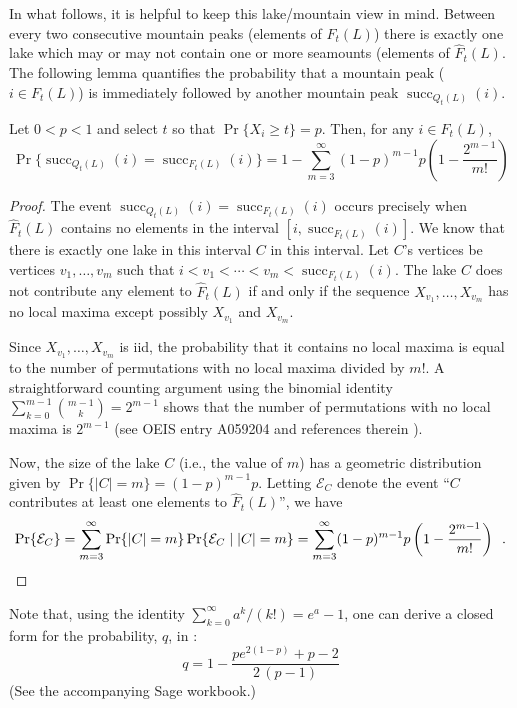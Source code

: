 \documentclass{patmorin}
\DeclareMathOperator{\cw}{succ}
\begin{document}
In what follows, it is helpful to keep this lake/mountain view in
mind. Between every two consecutive mountain peaks (elements of $F_t(L)$)
there is exactly one lake which may or may not contain one or more
seamounts (elements of $\hat{F}_t(L)$.  The following lemma quantifies
the probability that a mountain peak ($i\in F_t(L)$) is immediately
followed by another mountain peak $\cw_{Q_t(L)}(i)$.

\begin{lem}
  Let $0<p<1$ and select $t$ so that $\Pr\{X_i\ge t\}=p$.  Then,
  for any $i\in F_t(L)$, 
  \[
    \Pr\{\cw_{Q_t(L)}(i) = \cw_{F_t(L)}(i)\} =  
      1-\sum_{m=3}^\infty (1-p)^{m-1}p\left(1-\frac{2^{m-1}}{m!}\right)
  \]
\end{lem}

\begin{proof}
   The event $\cw_{Q_t(L)}(i) = \cw_{F_t(L)}(i)$ occurs precisely
   when $\hat{F}_t(L)$ contains no elements in the interval
   $[i,\cw_{F_t(L)}(i)]$.  We know that there is exactly one lake in
   this interval $C$ in this interval.  Let $C$'s vertices be vertices
   $v_1,\ldots,v_m$ such that $i<v_1<\cdots<v_m<\cw_{F_t(L)}(i)$. The
   lake $C$ does not contribute any element to $\hat{F}_t(L)$ if and
   only if the sequence $X_{v_1},\ldots,X_{v_m}$ has no local maxima
   except possibly $X_{v_1}$ and $X_{v_m}$.

   Since $X_{v_1},\ldots,X_{v_m}$ is iid, the probability that it contains
   no local maxima is equal to the number of permutations with no local
   maxima divided by $m!$.  A straightforward counting argument using
   the binomial identity $\sum_{k=0}^{m-1}\binom{m-1}{k}=2^{m-1}$ shows
   that the number of permutations with no local maxima is $2^{m-1}$
   (see OEIS entry A059204 and references therein \cite{X}).

   Now, the size of the lake $C$ (i.e., the value of $m$) has a
   geometric distribution given by $\Pr\{|C|=m\}=(1-p)^{m-1}p$.
   Letting $\mathcal{E}_C$ denote the event ``$C$  contributes at least
   one elements to $\hat{F}_t(L)$'', we have
   \[
     \Pr\{\mathcal{E}_C\} 
        = \sum_{m=3}^\infty \Pr\{|C|=m\}\Pr\{\mathcal{E}_C\mid |C|=m\} 
        = \sum_{m=3}^\infty (1-p)^{m-1}p\left(1-\frac{2^{m-1}}{m!}\right) 
           \enspace . \qedhere
   \]
\end{proof}

Note that, using the identity $\sum_{k=0}^\infty a^k/(k!)=e^a-1$, one
can derive a closed form for the probability, $q$, in :
\[
q = 
1-\frac{p e^{2(1-p)} + p - 2}{2 \, {\left(p - 1\right)}}
\]
(See the accompanying Sage workbook.)
\end{document}
